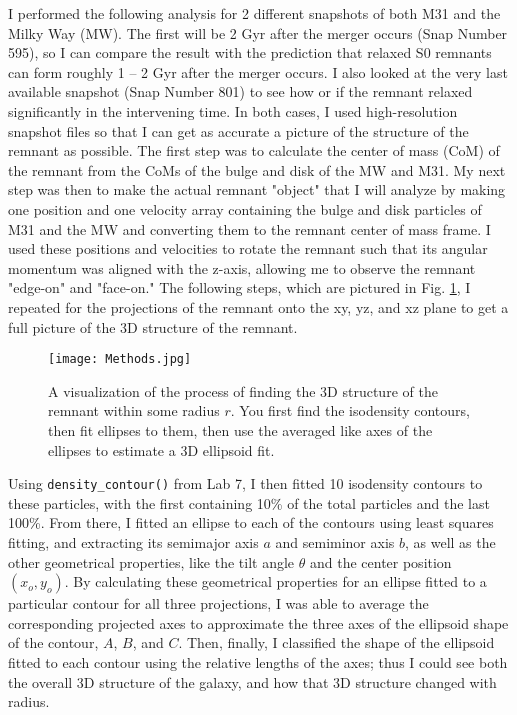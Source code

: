 \documentclass[twocolumn]{aastex631}
\begin{document}
I performed the following analysis for 2 different snapshots of both M31 and the Milky Way (MW). 
The first will be 2 Gyr after the merger occurs (Snap Number 595), so I can compare the result with the prediction that relaxed S0 remnants can form roughly 1 -- 2 Gyr after the merger occurs.
I also looked at the very last available snapshot (Snap Number 801) to see how or if the remnant relaxed significantly in the intervening time.
In both cases, I used high-resolution snapshot files so that I can get as accurate a picture of the structure of the remnant as possible.
The first step was to calculate the center of mass (CoM) of the remnant from the CoMs of the bulge and disk of the MW and M31. 
My next step was then to make the actual remnant "object" that I will analyze by making one position and one velocity array containing the bulge and disk particles of M31 and the MW and converting them to the remnant center of mass frame. 
I used these positions and velocities to rotate the remnant such that its angular momentum was aligned with the z-axis, allowing me to observe the remnant "edge-on" and "face-on."
The following steps, which are pictured in Fig. \ref{fig:methods}, I repeated for the projections of the remnant onto the xy, yz, and xz plane to get a full picture of the 3D structure of the remnant.
\begin{figure}[h!]
    \centering
    \texttt{[image: Methods.jpg]}
    \caption{
        A visualization of the process of finding the 3D structure of the remnant within some radius $r$. You first find the isodensity contours, then fit ellipses to them, then use the averaged like axes of the ellipses to estimate a 3D ellipsoid fit.
    }
    \label{fig:methods}
\end{figure}
Using \texttt{density\_contour()} from Lab 7, I then fitted 10 isodensity contours to these particles, with the first containing 10\% of the total particles and the last 100\%.
From there, I fitted an ellipse to each of the contours using least squares fitting, and extracting its semimajor axis $a$ and semiminor axis $b$, as well as the other geometrical properties, like the tilt angle $\theta$ and the center position $(x_o, y_o)$.
By calculating these geometrical properties for an ellipse fitted to a particular contour for all three projections, I was able to average the corresponding projected axes to approximate the three axes of the ellipsoid shape of the contour, $A$, $B$, and $C$.
Then, finally, I classified the shape of the ellipsoid fitted to each contour using the relative lengths of the axes; thus I could see both the overall 3D structure of the galaxy, and how that 3D structure changed with radius.
\end{document}
